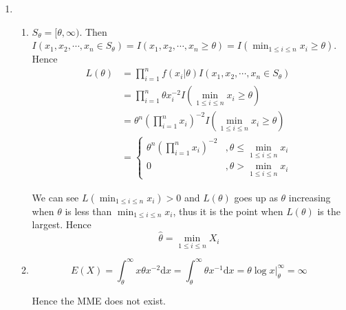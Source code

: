 \documentclass{article}
\begin{document}
\begin{enumerate}[leftmargin = 0 em, label = \arabic*., font = \bfseries]
	\item 
	\begin{enumerate}[start = 2]
		\item 
		$S_\theta = [\theta, \infty)$. Then 
		$I(x_1, x_2, \cdots, x_n \in S_\theta) = I(x_1, x_2, \cdots, x_n \geq \theta) = I(\min_{1\leq i \leq n} x_i \geq \theta)$. Hence
		\begin{align*}
		L(\theta) & = \prod_{i=1}^n f(x_i | \theta) I(x_1, x_2, \cdots, x_n \in S_\theta)\\
		& = \prod_{i=1}^n \theta x_i^{-2} I(\min_{1 \leq i \leq n}x_i \geq \theta)\\
		& = \theta^n (\prod_{i=1}^n x_i)^{-2} I(\min_{1 \leq i \leq n}x_i \geq \theta) \\
		& = \begin{cases}
			\theta^n (\prod_{i=1}^n x_i)^{-2} &, \theta \leq \min_{1 \leq i \leq n} x_i\\
			0 & , \theta > \min_{1 \leq i \leq n} x_i
		\end{cases}
				\end{align*}


		
		We can see $L(\min_{1 \leq i \leq n} x_i) > 0$ and $L(\theta)$ goes up as $\theta$ increasing when $\theta$ is less than $\min_{1 \leq i \leq n} x_i$, thus it is the point when $L(\theta)$ is the largest. Hence
		\[\hat{\theta} = \min_{1 \leq i \leq n} X_i\]


		\item 
		\[E(X) = \int_{\theta}^\infty x \theta x^{-2} \mathrm{d}x = \int_{\theta}^\infty \theta x^{-1} \mathrm{d}x = \theta \log x \bigg|_{\theta}^\infty = \infty\]

		Hence the MME does not exist.
	\end{enumerate}
	

	


 	\end{enumerate}


	
	
	
	
\end{document}
